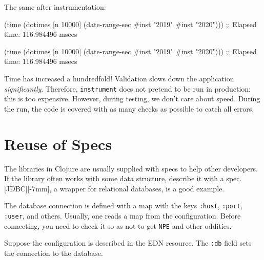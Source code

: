 \fi

\noindent
The same after instrumentation:

\ifx\DEVICETYPE\MOBILE

\begin{english}
  \begin{clojure}
(time
 (dotimes [n 10000]
   (date-range-sec #inst "2019"
                   #inst "2020")))
;; Elapsed time: 116.984496 msecs
  \end{clojure}
\end{english}

\else

\begin{english}
  \begin{clojure}
(time
 (dotimes [n 10000]
   (date-range-sec #inst "2019" #inst "2020")))
;; Elapsed time: 116.984496 msecs
  \end{clojure}
\end{english}

\fi


Time has increased a hundredfold! Validation slows down the application \emph{significantly}. Therefore, \verb|instrument| does not pretend to be run in production: this is too expensive. However, during testing, we don't care about speed. During the run, the code is covered with as many checks as possible to catch all errors.

\section{Reuse of Specs}


The libraries in Clojure are usually supplied with specs to help other developers. If the library often works with some data structure, describe it with a spec. [JDBC][-7mm], a wrapper for relational databases, is a good example.

The database connection is defined with a map with the keys \verb|:host|, \verb|:port|, \verb|:user|, and others. Usually, one reads a map from the configuration. Before connecting, you need to check it so as not to get \verb|NPE| and other oddities.


Suppose the configuration is described in the EDN resource. The \verb|:db| field sets the connection to the database.

